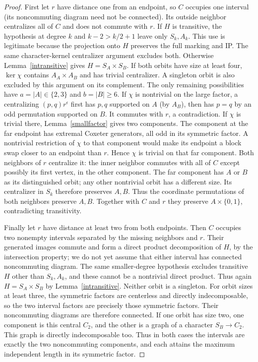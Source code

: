 \begin{proof}
First let $r$ have distance one from an endpoint, so $C$ occupies
one interval (its noncommuting diagram need not be connected).
Its outside neighbor centralizes all of $C$ and does not commute with
$r$. If $H$ is transitive, the hypothesis at degree $k$ and
$k-2>k/2+1$ leave only $S_k,A_k$. This use is legitimate because
the projection onto $H$ preserves the full marking and IP. The same
character-kernel centralizer argument excludes both.
Otherwise Lemma~\ref{intransitive} gives $H=S_A\times S_B$.
If both orbits have size at least four, $\ker\chi$ contains
$A_A\times A_B$ and has trivial centralizer. A singleton orbit is
also excluded by this argument on its complement. The only remaining
possibilities have $a=|A|\in\{2,3\}$ and $b=|B|\geq6$.
If $\chi$ is nontrivial on the large factor, a centralizing
$(p,q)r^\epsilon$ first has $p,q$ supported on $A$ (by $A_B$),
then has $p=q$ by an odd permutation supported on $B$. It commutes
with $r$, a contradiction. If $\chi$ is trivial there,
Lemma~\ref{smallfactor} gives two components. The component at the far
endpoint has extremal Coxeter generators, all odd in its symmetric
factor. A nontrivial restriction of $\chi$ to that component would
make its endpoint a block swap closer to an endpoint than $r$.
Hence $\chi$ is trivial on that far component. Both neighbors of $r$
centralize it: the inner neighbor commutes with all of $C$ except
possibly its first vertex, in the other component. The far component
has $A$ or $B$ as its distinguished orbit; any other nontrivial orbit
has a different size. Its centralizer in $S_k$ therefore preserves
$A,B$. Thus the coordinate permutations of both neighbors preserve
$A,B$. Together with $C$ and $r$ they preserve $A\times\{0,1\}$,
contradicting transitivity.

Finally let $r$ have distance at least two from both endpoints.
Then $C$ occupies two nonempty intervals separated by the missing
neighbors and $r$. Their generated images commute and form a direct
product decomposition of $H$, by the intersection property; we do not
yet assume that either interval has connected noncommuting diagram.
The same smaller-degree hypothesis excludes transitive $H$ other than
$S_k,A_k$, and these cannot be a nontrivial direct product. Thus again
$H=S_A\times S_B$ by Lemma~\ref{intransitive}.
Neither orbit is a singleton. For orbit sizes at least three, the
symmetric factors are centerless and directly indecomposable, so
the two interval factors are precisely those symmetric factors. Their
noncommuting diagrams are therefore connected. If one orbit has
size two, one component is this central $C_2$, and the other is a
graph of a character $S_B\to C_2$. This graph is directly
indecomposable too. Thus in both cases the intervals are exactly the
two noncommuting components, and each attains the maximum independent
length in its symmetric factor.


\end{proof}
